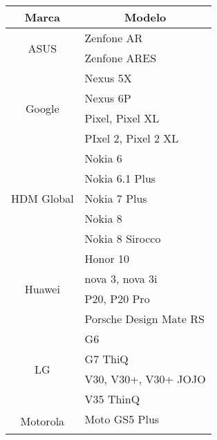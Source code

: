\begin{table}[]
	\begin{tabular}{|c|l|}
		\hline
		\textbf{Marca}              & \multicolumn{1}{c|}{\textbf{Modelo}}               \\ \hline
		\multirow{2}{*}{ASUS}       & Zenfone AR                                         \\ \cline{2-2} 
		& Zenfone ARES                                       \\ \hline
		\multirow{4}{*}{Google}     & Nexus 5X                                           \\ \cline{2-2} 
		& Nexus 6P                                           \\ \cline{2-2} 
		& Pixel, Pixel XL                                    \\ \cline{2-2} 
		& PIxel 2, Pixel 2 XL                                \\ \hline
		\multirow{5}{*}{HDM Global} & Nokia 6                                            \\ \cline{2-2} 
		& Nokia 6.1 Plus                                     \\ \cline{2-2} 
		& Nokia 7 Plus                                       \\ \cline{2-2} 
		& Nokia 8                                            \\ \cline{2-2} 
		& Nokia 8 Sirocco                                    \\ \hline
		\multirow{4}{*}{Huawei}     & Honor 10                                           \\ \cline{2-2} 
		& nova 3, nova 3i                                    \\ \cline{2-2} 
		& P20, P20 Pro                                       \\ \cline{2-2} 
		& Porsche Design Mate RS                             \\ \hline
		\multirow{4}{*}{LG}         & G6                                                 \\ \cline{2-2} 
		& G7 ThiQ                                            \\ \cline{2-2} 
		& V30, V30+, V30+ JOJO                               \\ \cline{2-2} 
		& V35 ThinQ                                          \\ \hline
		\multirow{7}{*}{Motorola}   & Moto GS5 Plus                                      \\ \cline{2-2} 

\end{tabular}
\end{table}
